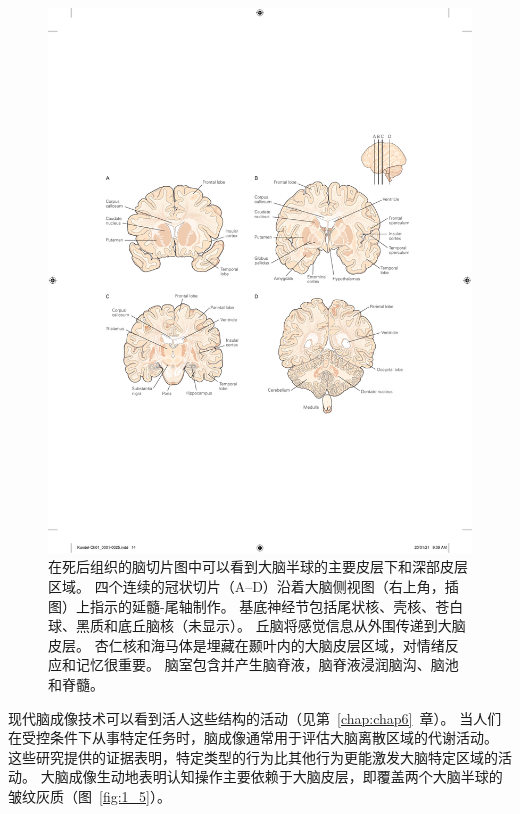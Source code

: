 \begin{figure}[htbp]
	\centering
	\includegraphics[width=0.8\linewidth]{chap01/fig_1_4}
	\caption{在死后组织的脑切片图中可以看到大脑半球的主要皮层下和深部皮层区域。
		四个连续的冠状切片（A–D）沿着大脑侧视图（右上角，插图）上指示的延髓-尾轴制作。
		基底神经节包括尾状核、壳核、苍白球、黑质和底丘脑核（未显示）。
		丘脑将感觉信息从外围传递到大脑皮层。
		杏仁核和海马体是埋藏在颞叶内的大脑皮层区域，对情绪反应和记忆很重要。
		脑室包含并产生脑脊液，脑脊液浸润脑沟、脑池和脊髓\cite{nieuwenhuys2007human}。}
	\label{fig:1_4}
\end{figure}


现代脑成像技术可以看到活人这些结构的活动（见第~\ref{chap:chap6}~章）。
当人们在受控条件下从事特定任务时，脑成像通常用于评估大脑离散区域的代谢活动。
这些研究提供的证据表明，特定类型的行为比其他行为更能激发大脑特定区域的活动。
大脑成像生动地表明认知操作主要依赖于大脑皮层，即覆盖两个大脑半球的皱纹灰质（图~\ref{fig:1_5}）。


